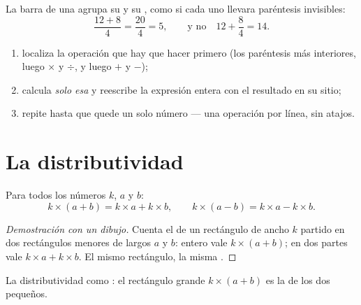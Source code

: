 \begin{remark}
La barra de una  agrupa su  y su , como si cada uno
llevara paréntesis invisibles:
\[
\frac{12 + 8}{4} = \frac{20}{4} = 5,
\qquad\text{y no}\quad 12 + \frac{8}{4} = 14 .
\]
\end{remark}

\begin{method}\label{met:g7:priorities:safe}
\begin{enumerate}
  \item localiza la operación que hay que hacer primero (los paréntesis más interiores, luego
        $\times$ y $\div$, y luego $+$ y $-$);
  \item calcula \emph{solo esa} y reescribe la expresión entera
        con el resultado en su sitio;
  \item repite hasta que quede un solo número --- una operación por línea, sin
        atajos.
\end{enumerate}
\end{method}

\section{La distributividad}

\begin{theorem}[Distributividad]\label{thm:g7:priorities:distributivity}
Para todos los números $k$, $a$ y $b$:
\[
k \times (a + b) = k \times a + k \times b,
\qquad
k \times (a - b) = k \times a - k \times b .
\]
\end{theorem}

\begin{proof}[Demostración con un dibujo]
Cuenta el  de un rectángulo de ancho $k$ partido en dos rectángulos
menores de largos $a$ y $b$: entero vale $k \times (a+b)$;
en dos partes vale $k \times a + k \times b$. El mismo rectángulo, la misma
.
\end{proof}

\begin{omfigure}

{\small La distributividad como : el rectángulo grande
$k \times (a + b)$ es la  de los dos pequeños.}
\end{omfigure}

